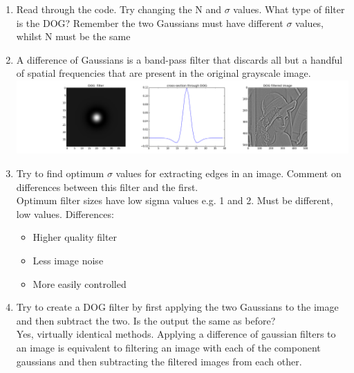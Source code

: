 \documentclass[12pt,english]{scrartcl}
\begin{document}
\begin{enumerate}
 \color{black}
 \item  Read through the code. Try changing the N and $\sigma$ values. What type of filter is the DOG? Remember the two Gaussians must have different $\sigma$ values, whilst N must be the same\\ 
 \color{blue}
 \item[]
 A difference of Gaussians is a band-pass filter that discards all but a handful of spatial frequencies that are present in the original grayscale image. \\ 
\centering
 \includegraphics[scale=0.28]{task_2_1.png} 

 \color{black}
 \raggedright
 \item Try to find optimum $\sigma$ values for extracting edges in an image. Comment on differences between this filter and the first.\\
 \color{blue}
 Optimum filter sizes have low sigma values e.g. 1 and 2. Must be different, low values.
 \color{blue}
 Differences:
 \begin{itemize}
 \item Higher quality filter 
 \item Less image noise
 \item More easily controlled
 \end{itemize}
 
 \color{black}
 \item Try to create a DOG filter by first applying the two Gaussians to the image and then subtract the two. Is the output the same as before? \\
 \color{blue}
 Yes, virtually identical methods. Applying a difference of gaussian filters to an image is equivalent to filtering an image with each of the component gaussians and then subtracting the filtered images from each other.
\end{enumerate}
 
\end{document}
